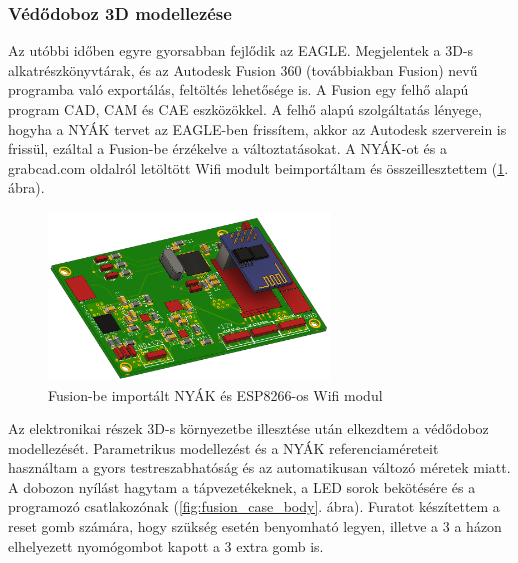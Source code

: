 \documentclass[../main.tex]{subfiles}
\begin{document}
        \subsubsection{Védődoboz 3D modellezése}
            Az utóbbi időben egyre gyorsabban fejlődik az EAGLE. Megjelentek a 3D-s alkatrészkönyvtárak, és az Autodesk Fusion 360 (továbbiakban Fusion) nevű programba való exportálás, feltöltés lehetősége is. A Fusion egy felhő alapú program CAD, CAM és CAE eszközökkel. A felhő alapú szolgáltatás lényege, hogyha a NYÁK tervet az EAGLE-ben frissítem, akkor az Autodesk szerverein is frissül, ezáltal a Fusion-be érzékelve a változtatásokat.
            A NYÁK-ot és a grabcad.com oldalról letöltött Wifi modult beimportáltam és összeillesztettem (\ref{fig:fusion_pcb_esp8266}. ábra).
            
            \begin{figure}[h!]
                    \centering
                        \includegraphics[width=7.5cm]{resources/pcb_res/fusion_pcb_esp8266.png}
                    \caption{Fusion-be importált NYÁK és ESP8266-os Wifi modul}
                    \label{fig:fusion_pcb_esp8266}
            \end{figure}
            
            Az elektronikai részek 3D-s környezetbe illesztése után elkezdtem a védődoboz modellezését. Parametrikus modellezést és a NYÁK referenciaméreteit használtam a gyors testreszabhatóság és az automatikusan változó méretek miatt. A dobozon nyílást hagytam a tápvezetékeknek, a LED sorok bekötésére és a programozó csatlakozónak (\ref{fig:fusion_case_body}. ábra).  Furatot készítettem a reset gomb számára, hogy szükség esetén benyomható legyen, illetve a 3 a házon elhelyezett nyomógombot kapott a 3 extra gomb is. 
            
\end{document}
